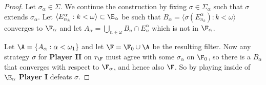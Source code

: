 \documentclass{article}
\begin{document}
\begin{proof}
Let \(\sigma_{\alpha} \in \Sigma\). We continue the construction by fixing \(\sigma \in \Sigma_{\alpha}\) such that \(\sigma\) extends \(\sigma_{\alpha}\). Let \(\langle E_{n_k}^{\alpha}: k < \omega \rangle \subset \E_{\alpha}\) be such that \(B_{\alpha} = \langle \sigma(E_{n_k}^{\alpha}): k < \omega \rangle\) converges to \(\F_{\alpha}\) and let \(A_{\alpha} = \bigcup_{n \in \omega}B_n \cap E_n^{\alpha}\) which is not in \(\F_{\alpha}\).

Let \(\A = \{A_{\alpha}:\alpha < \omega_1\}\) and let \(\F = \F_0\cup\A\) be the resulting filter. Now any strategy \(\sigma\) for \textbf{Player II} on \(\tau_{\F}\) must agree with some \(\sigma_{\alpha}\) on \(\F_0\), so there is a \(B_{\alpha}\) that converges with respect to \(\F_{\alpha}\), and hence also \(\F\). So by playing inside of \(\E_{\alpha}\) \textbf{Player I} defeats \(\sigma\).

\end{proof}
%
%
\end{document}
